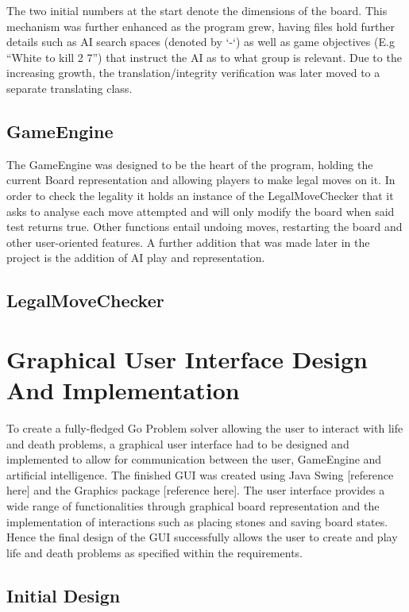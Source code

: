 \documentclass{l3proj}
\begin{document}
The two initial numbers at the start denote the dimensions of the board. This mechanism was further enhanced as the program grew, having files hold further details such as AI search spaces (denoted by ‘-‘) as well as game objectives (E.g “White to kill 2 7”) that instruct the AI as to what group is relevant. Due to the increasing growth, the translation/integrity verification was later moved to a separate translating class.

\subsection{GameEngine}

The GameEngine was designed to be the heart of the program, holding the current Board representation and allowing players to make legal moves on it. In order to check the legality it holds an instance of the LegalMoveChecker that it asks to analyse each move attempted and will only modify the board when said test returns true. Other functions entail undoing moves, restarting the board and other user-oriented features. A further addition that was made later in the project is the addition of AI play and representation. 

\subsection{LegalMoveChecker}

\section{Graphical User Interface Design And Implementation}

To create a fully-fledged Go Problem solver allowing the user to interact with life and death problems, a graphical user interface had to be designed and implemented to allow for communication between the user, GameEngine and artificial intelligence. The finished GUI was created using Java Swing [reference here] and the Graphics package [reference here]. The user interface provides a wide range of functionalities through graphical board representation and the implementation of interactions such as placing stones and saving board states. Hence the final design of the GUI successfully allows the user to create and play life and death problems as specified within the requirements.

\subsection{Initial Design}
\end{document}
